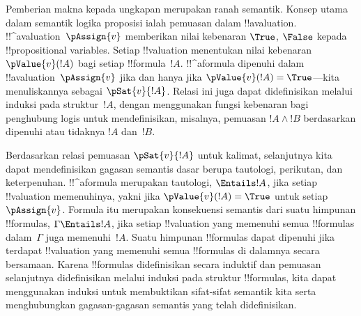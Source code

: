 \documentclass[../../../include/open-logic-section]{subfiles}
\begin{document}
Pemberian makna kepada ungkapan merupakan ranah semantik. Konsep utama dalam
semantik logika proposisi ialah pemuasan dalam !!a{valuation}.
!!^a{valuation}~$\pAssign{v}$ memberikan nilai kebenaran $\True$, $\False$
kepada !!{propositional variable}s. Setiap !!{valuation} menentukan nilai
kebenaran $\pValue{v}(!A)$ bagi setiap !!{formula}~$!A$.
!!^a{formula} dipenuhi dalam !!a{valuation}~$\pAssign{v}$ jika dan hanya jika
$\pValue{v}(!A) = \True$---kita menuliskannya sebagai $\pSat{v}{!A}$.
Relasi ini juga dapat didefinisikan melalui induksi pada struktur~$!A$,
dengan menggunakan fungsi kebenaran bagi penghubung logis untuk
mendefinisikan, misalnya, pemuasan $!A \land !B$ berdasarkan dipenuhi atau
tidaknya $!A$ dan~$!B$.

Berdasarkan relasi pemuasan $\pSat{v}{!A}$ untuk kalimat, selanjutnya kita
dapat mendefinisikan gagasan semantis dasar berupa tautologi, perikutan, dan
keterpenuhan. !!^a{formula} merupakan tautologi, $\Entails !A$, jika setiap
!!{valuation} memenuhinya, yakni jika $\pValue{v}(!A) = \True$ untuk setiap
$\pAssign{v}$. Formula itu merupakan konsekuensi semantis dari suatu himpunan
!!{formula}s, $\Gamma \Entails !A$, jika setiap !!{valuation} yang memenuhi
semua !!{formula}s dalam~$\Gamma$ juga memenuhi~$!A$. Suatu himpunan
!!{formula}s dapat dipenuhi jika terdapat !!{valuation} yang memenuhi semua
!!{formula}s di dalamnya secara bersamaan. Karena !!{formula}s didefinisikan
secara induktif dan pemuasan selanjutnya didefinisikan melalui induksi pada
struktur !!{formula}s, kita dapat menggunakan induksi untuk membuktikan
sifat-sifat semantik kita serta menghubungkan gagasan-gagasan semantis yang
telah didefinisikan.
\end{document}
